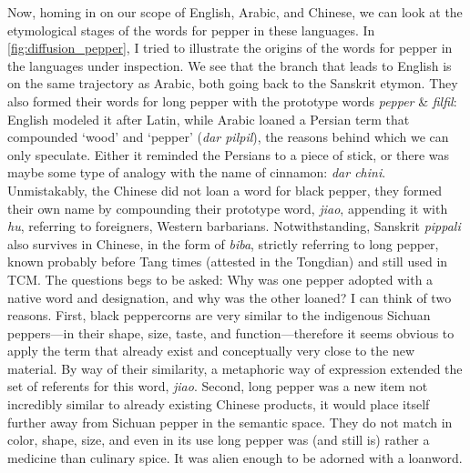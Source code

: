 Now, homing in on our scope of English, Arabic, and Chinese, we can look at the etymological stages of the words for pepper in these languages. In \cref{fig:diffusion_pepper}, I tried to illustrate the origins of the words for pepper in the languages under inspection. We see that the branch that leads to English is on the same trajectory as Arabic, both going back to the Sanskrit etymon. They also formed their words for long pepper with the prototype words \textit{pepper} \& \textit{filfil}: English modeled it after Latin, while Arabic loaned a Persian term that compounded `wood' and `pepper' (\textit{dar pilpil}), the reasons behind which we can only speculate. Either it reminded the Persians to a piece of stick, or there was maybe some type of analogy with the name of cinnamon: \textit{dar chini}. Unmistakably, the Chinese did not loan a word for black pepper, they formed their own name by compounding their prototype word, \textit{jiao}, appending it with \textit{hu}, referring to foreigners, Western barbarians. Notwithstanding, Sanskrit \textit{pippali} also survives in Chinese, in the form of \textit{biba}, strictly referring to long pepper, known probably before Tang times (attested in the \gls{Tongdian}) and still used in \gls{TCM}. The questions begs to be asked: Why was one pepper adopted with a native word and designation, and why was the other loaned? I can think of two reasons. First, black peppercorns are very similar to the indigenous Sichuan peppers---in their shape, size, taste, and function---therefore it seems obvious to apply the term that already exist and conceptually very close to the new material. By way of their similarity, a metaphoric way of expression extended the set of referents for this word, \textit{jiao}. Second, long pepper was a new item not incredibly similar to already existing Chinese products, it would place itself further away from Sichuan pepper in the semantic space. They do not match in color, shape, size, and even in its use long pepper was (and still is) rather a medicine than culinary spice. It was alien enough to be adorned with a loanword.





